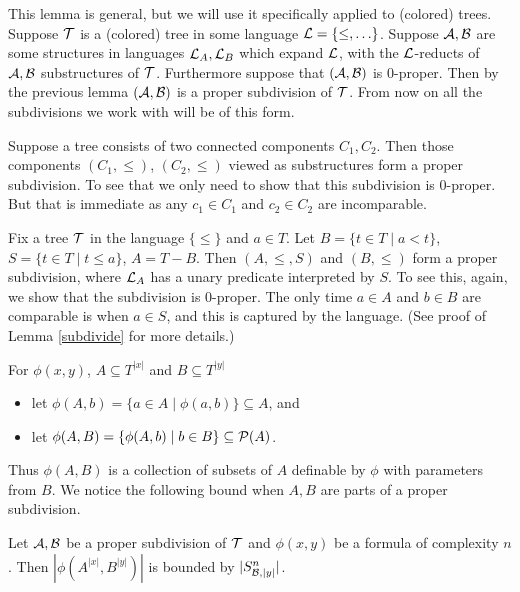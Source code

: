 This lemma is general, but we will use it specifically applied to (colored) trees.
Suppose $\operatorname{\mathcal T}$ is a (colored) tree in some language $\mathcal L = \{\leq, \ldots\}$.
Suppose $\mathcal A, \mathcal B$ are some structures in languages $\mathcal L_A, \mathcal L_B$ which expand $\mathcal L$, with the $\mathcal L$-reducts of $\mathcal A, \mathcal B$ substructures of $\operatorname{\mathcal T}$.
Furthermore suppose that $(\mathcal A, \mathcal B)$ is 0-proper.
Then by the previous lemma $(\mathcal A, \mathcal B)$ is a proper subdivision of $\operatorname{\mathcal T}$.
From now on all the subdivisions we work with will be of this form.

\begin{Example} \label{ex_disc}
  Suppose a tree consists of two connected components $C_1, C_2$.
  Then those components $(C_1, \leq)$, $(C_2, \leq)$ viewed as substructures form a proper subdivision.
  To see that we only need to show that this subdivision is 0-proper.
  But that is immediate as any $c_1 \in C_1$ and $c_2 \in C_2$ are incomparable.
\end{Example}

\begin{Example} \label{ex_cone}
  Fix a tree $\operatorname{\mathcal T}$ in the language $\{\leq\}$ and $a \in T$. Let $B = \{t \in T \mid a < t\}$, $S = \{t \in T \mid t \leq a\}$, $A = T - B$. Then $(A, \leq, S)$ and $(B, \leq)$ form a proper subdivision, where $\mathcal L_A$ has a unary predicate interpreted by $S$.
  To see this, again, we show that the subdivision is 0-proper.
  The only time $a \in A$ and $b \in B$ are comparable is when $a \in S$, and this is captured by the language.
  (See proof of Lemma \ref{subdivide} for more details.)
\end{Example}

\begin{Definition} For $\phi(x, y)$, $A \subseteq T^{|x|}$ and $B \subseteq T^{|y|}$
  \begin{itemize}
  \item let $\phi(A, b) = \{a \in A \mid \phi(a, b)\} \subseteq A$, and 
  \item let $\phi(A, B) = \{\phi(A, b) \mid b \in B\} \subseteq \mathcal P(A)$.	
  \end{itemize}
\end{Definition}
Thus $\phi(A, B)$ is a collection of subsets of $A$ definable by $\phi$ with parameters from $B$. We notice the following bound when $A, B$ are parts of a proper subdivision.

\begin{Corollary} \label{cor_type_count}
  Let $\mathcal A, \mathcal B$ be a proper subdivision of $\operatorname{\mathcal T}$ and $\phi(x,y)$ be a formula of complexity $n$. Then $|\phi(A^{|x|}, B^{|y|})|$ is bounded by $|S^n_{\mathcal B, |y|}|$.
\end{Corollary}


